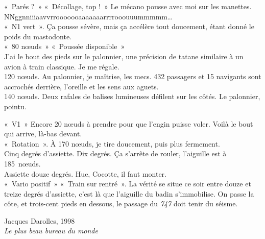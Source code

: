 	\onlyframabook{\begin{quote}}
	\onlyamphibook{\begin{historyquote}}
	\begin{footnotesize}
		«~Parés ?~» «~Décollage, top !~» Le mécano pousse avec moi sur les manettes.\\
		NNggnniiiaavvrrooooooaaaaaaarrrrooouuummmmm…\\
		«~N1 vert~». Ça pousse sévère, mais ça accélère tout doucement, étant donné le poids du mastodonte.\\
		«~80 nœuds~» «~Poussée disponible~»\\
		J’ai le bout des pieds sur le palonnier, une précision de tatane similaire à un avion à train classique. Je me régale.\\
		120 nœuds. Au palonnier, je maîtrise, les mecs. 432 passagers et 15 navigants sont accrochés derrière, l’oreille et les sens aux aguets.\\
		140 nœuds. Deux rafales de balises lumineuses défilent sur les côtés. Le palonnier, pointu.
		
		«~V1~» Encore 20 nœuds à prendre pour que l'engin puisse voler. Voilà le bout qui arrive, là-bas devant.\\
		«~Rotation~». À 170 nœuds, je tire doucement, puis plus fermement.\\
		Cinq degrés d'assiette. Dix degrés. Ça s’arrête de rouler, l’aiguille est à 185~nœuds.\\
		Assiette douze degrés. Hue, Cocotte, il faut monter.\\
		«~Vario positif~» «~Train sur rentré~». La vérité se situe ce soir entre douze et treize degrés d’assiette, c'est là que l'aiguille du badin s'immobilise. On passe la côte, et trois-cent pieds en dessous, le passage du \textit{747} doit tenir du séisme.
			\begin{flushright}\vspace{-0.5em}Jacques Darolles, 1998\\ \textit{Le plus beau bureau du monde}~\cite{darolles2000}\end{flushright}
	\end{footnotesize}
	\onlyamphibook{\end{historyquote}}
	\onlyframabook{\end{quote}}

